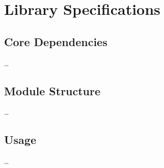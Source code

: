 
\section{Library Specifications}\label{sec:library-specifications}
    \subsection{Core Dependencies}\label{subsec:core-dependencies}
        \dots

    \subsection{Module Structure}\label{subsec:module-structure}
        \dots

    \subsection{Usage}\label{subsec:usage}
        \dots
